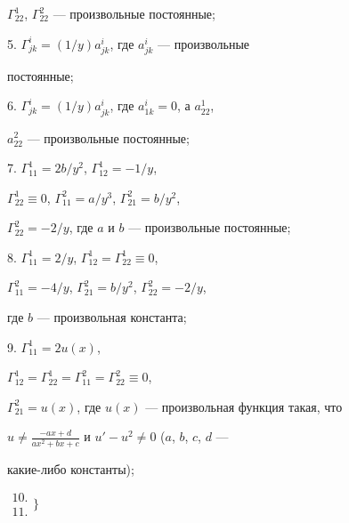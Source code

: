 $\Gamma^1_{22}$, $\Gamma^2_{22}$ --- произвольные постоянные; 


\smallskip


 


5. $\Gamma^i_{jk}=(1/y)a^i_{jk}$, где $a^i_{jk}$ --- произвольные 


постоянные; 


\smallskip


 


6. $\Gamma^i_{jk}=(1/y)a^i_{jk}$, где $a^i_{1k}=0$, а $a^1_{22}$, 


$a^2_{22}$ --- произвольные постоянные; 


\smallskip


 


7. $\Gamma^1_{11}=2b/y^2$, $\Gamma^1_{12}=-1/y$, 


$\Gamma^1_{22}\equiv0$, $\Gamma^2_{11}=a/y^3$, $\Gamma^2_{21}=b/y^2$, 


$\Gamma^2_{22}=-2/y$, где $a$ и $b$ --- произвольные постоянные; 


\smallskip


 


8. $\Gamma^1_{11}=2/y$, $\Gamma^1_{12}=\Gamma^1_{22}\equiv0$, 


$\Gamma^2_{11}=-4/y$, $\Gamma^2_{21}=b/y^2$, $\Gamma^2_{22}=-2/y$,


где $b$ --- произвольная константа; 


\smallskip


 


9. $\Gamma^1_{11}=2u(x)$, 


$\Gamma^1_{12}=\Gamma^1_{22}=\Gamma^2_{11}=\Gamma^2_{22}\equiv0$, 


$\Gamma^2_{21}=u(x)$, где $u(x)$ --- произвольная функция такая, что 


$u\ne\frac{-ax+d}{ax^2+bx+c}$ и $u'-u^2\ne0$ ($a$, $b$, $c$, $d$ --- 


какие-либо константы); 


\smallskip





\hspace{-1.6mm}$\begin{array}{l} 10.\\ 11.\end{array}\bigg\}$ 


